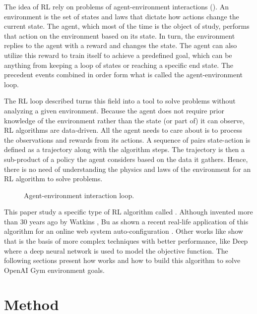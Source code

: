 \documentclass[conference]{IEEEtran}
\begin{document}
The idea of RL rely on problems of agent-environment interactions ().
An environment is the set of states and laws that dictate how actions change the current state.
The agent, which most of the time is the object of study, performs that action on the environment based on its state.
In turn, the environment replies to the agent with a reward and changes the state.
The agent can also utilize this reward to train itself to achieve a predefined goal, which can be anything from keeping a loop of states or reaching a specific end state.
The precedent events combined in order form what is called the agent-environment loop.

The RL loop described turns this field into a tool to solve problems without analyzing a given environment.
Because the agent does not require prior knowledge of the environment rather than the state (or part of) it can observe, RL algorithms are data-driven.
All the agent needs to care about is to process the observations and rewards from its actions.
A sequence of pairs state-action is defined as a trajectory along with the algorithm steps.
The trajectory is then a sub-product of a policy the agent considers based on the data it gathers.
Hence, there is no need of understanding the physics and laws of the environment for an RL algorithm to solve problems.

\begin{figure}[b]
    \centering
    
    \caption{Agent-environment interaction loop.}
    \label{agent-environment}
\end{figure}

This paper study a specific type of RL algorithm called {\Qlearning}.
Although invented more than 30 years ago by Watkins \cite{Watkins:1989}, Bu as shown a recent real-life application of this algorithm for an online web system auto-configuration \cite{Bu:2009}.
Other works like \cite{Zheng:2018} show that {\Qlearning} is the basis of more complex techniques with better performance, like Deep{\QLearning} where a deep neural network is used to model the {\Qlearning} objective function.
The following sections present how {\Qlearning} works and how to build this algorithm to solve OpenAI Gym \cite{OpenAIGym} environment goals.


\section{Method}
\end{document}
